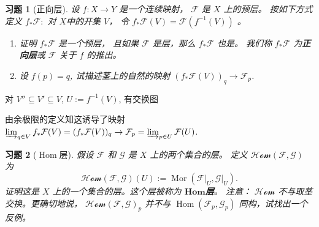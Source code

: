 \theoremstyle{plain}
\newtheorem{exercise}{习题}
\nosectionnumbers

\begin{exercise}[正向层]
    设 $f: X \rightarrow Y$ 是一个连续映射， $\mathcal{F}$ 是 $X$ 上的预层。
    按如下方式定义 $f_{*} \mathcal{F}:$ 对 $X$中的开集 $V$，
    令 $f_{*} \mathcal{F}(V)=\mathcal{F}\left(f^{-1}(V)\right)$ 。
    \begin{enumerate}
        \item 证明 $f_{*} \mathcal{F}$ 是一个预层，
        且如果 $\mathcal{F}$ 是层，那么 $f_{*} \mathcal{F}$ 也是。
        我们称 $f_{*} \mathcal{F}$ 为\textbf{正向层}或 $\mathcal{F}$ 关于 $f$ 的\textit{推出}。
        \item 设 $f(p)=q$, 试描述茎上的自然的映射 $\left(f_{*} \mathcal{F}(V)\right)_{q} \rightarrow \mathcal{F}_{p}$.
    \end{enumerate}
\end{exercise}

\begin{proofc}
    对 $V''\subseteq V'\subseteq V$, $U:= f^{-1}(V)$,
    有交换图
    由余极限的定义知这诱导了映射 $\varinjlim_{q\in V} f_* \mathcal{F}(V) = (f_* \mathcal{F}(V))_q \to \mathcal{F}_p = \varinjlim_{p \in U} \mathcal{F} (U)$.
\end{proofc}

\begin{exercise}[$\operatorname{Hom}$层]
    假设 $\mathcal{F}$ 和 $\mathcal{G}$ 是 $X$ 上的两个集合的层。
    定义 $\mathcal{Hom}(\mathcal{F}, \mathcal{G})$ 为
    $$
        \mathcal{Hom}(\mathcal{F}, \mathcal{G})(U):=\operatorname{Mor}(\left.\mathcal{F}\right|_{U},\left.\mathcal{G}\right|_{U}).
    $$
    证明这是 $X$ 上的一个集合的层。这个层被称为 $\mathbf{Hom}$\textbf{层}。
    注意： $\mathcal{Hom}$ 不与取茎交换。更确切地说， $\mathcal{Hom}(\mathcal{F}, \mathcal{G})_{p}$ 并不与 $\operatorname{Hom}(\mathcal{F}_{p}, \mathcal{G}_{p})$ 同构，试找出一个反例。
\end{exercise}

